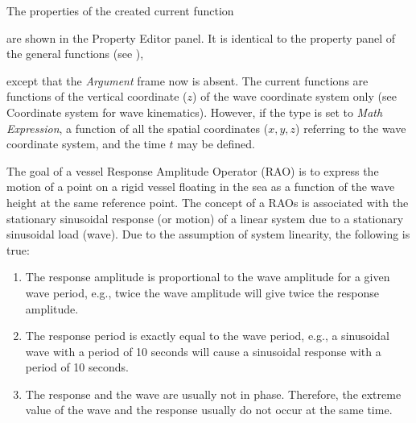 The properties of the created current function
\vskip0pt\noindent\begin{minipage}{0.68\textwidth}\raggedright
are shown in the Property Editor panel.
It is identical to the property panel of the general functions
(see ),
\end{minipage}

\vskip-2pt\noindent except that the {\sl Argument} frame now is absent.
The current functions are functions of the vertical coordinate ($z$)
of the wave coordinate system only (see
           {Coordinate system for wave kinematics}).
However, if the type is set to {\sl Math Expression},
a function of all the spatial coordinates ($x, y, z$)
referring to the wave coordinate system, and the time $t$ may be defined.



The goal of a vessel Response Amplitude Operator (RAO) is to express the motion
of a point on a rigid vessel floating in the sea as a function of the wave
height at the same reference point. The concept of a RAOs is associated with the
stationary sinusoidal response (or motion) of a linear system due to a
stationary sinusoidal load (wave). Due to the assumption of system linearity,
the following is true:

\clearpage
\begin{enumerate}
\item
  The response amplitude is proportional to the wave amplitude for a given wave
  period, e.g., twice the wave amplitude will give twice the response amplitude.
\item
  The response period is exactly equal to the wave period, e.g., a sinusoidal
  wave with a period of 10 seconds will cause a sinusoidal response with
  a period of 10 seconds.
\item
  The response and the wave are usually not in phase. Therefore, the extreme
  value of the wave and the response usually do not occur at the same time.
\end{enumerate}

